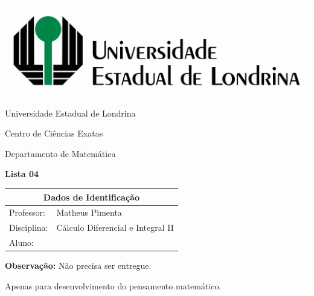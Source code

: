 \documentclass[oneside,a4paper,12pt]{article}
\newcommand{\universidade}{Universidade Estadual de Londrina}
\newcommand{\centro}{Centro de Ciências Exatas}
\newcommand{\departamento}{Departamento de Matemática}
\newcommand{\curso}{Ciência da Computação}
\newcommand{\professores}{Matheus Pimenta}
\newcommand{\disciplina}{Cálculo Diferencial e Integral II}
\begin{document}
	\pagestyle{empty}
	
	\begin{center}
		\includegraphics[width=\linewidth/2]{logo.jpg}%
	 	\vspace{2pt} 	
		
		\universidade
		\par
		\centro
		\par
		\departamento
		\par
		\par
		\vspace{12pt}
		\LARGE \textbf{Lista 04}
		
	\end{center}
	
	\vspace{12pt}
	
	\begin{tabular}{ |l|p{12cm}| }
		
		\hline
		\multicolumn{2}{|c|}{\textbf{Dados de Identificação}} \\
		\hline
		Professor:         &    \professores           \\
		\hline
		Disciplina:        &    \disciplina          \\
		\hline
		Aluno:             &                   \\
		\hline
		
	\end{tabular}
	\vspace{6pt}
	
	{\bf Observação:} Não precisa ser entregue. 
	
	Apenas para desenvolvimento do pensamento matemático.
	
	\begin{snugshade}
	\end{snugshade}
\end{document}
